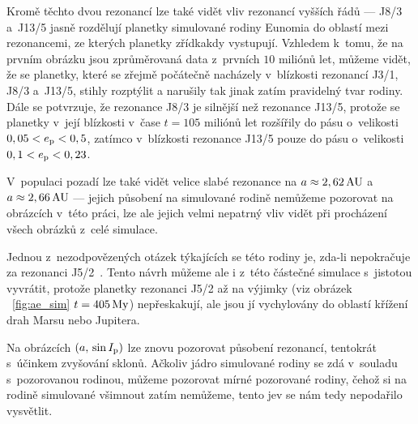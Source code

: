 \documentclass[A4paper, 12pt, oneside]{book}
\begin{document}
Kromě těchto dvou rezonancí lze také vidět vliv rezonancí vyšších řádů --- J8/3 a~J13/5 jasně rozdělují planetky simulované rodiny Eunomia do oblastí mezi rezonancemi, ze kterých planetky zřídkakdy vystupují. Vzhledem k~tomu, že na prvním obrázku jsou zprůměrovaná data z~prvních $10$ miliónů let, můžeme vidět, že se planetky, které se zřejmě počátečně nacházely v~blízkosti rezonancí J3/1, J8/3 a~J13/5, stihly rozptýlit a narušily tak jinak zatím pravidelný tvar rodiny. Dále se potvrzuje, že rezonance J8/3 je silnější než rezonance J13/5, protože se planetky v~její blízkosti v~čase $t=105$ miliónů let rozšířily do pásu o~velikosti $0,05<e_{\rm p}<0,5$, zatímco v~blízkosti rezonance J13/5 pouze do pásu o~velikosti $0,1<e_{\rm p}<0,23$.

V~populaci pozadí lze také vidět velice slabé rezonance na $a\approx2,62\,{\rm AU}$ a~$a\approx2,66\,{\rm AU}$ --- jejich působení na simulované rodině nemůžeme pozorovat na obrázcích v~této práci, lze ale jejich velmi nepatrný vliv vidět při procházení všech obrázků z~celé simulace.

Jednou z~nezodpovězených otázek týkajících se této rodiny je, zda-li nepokračuje za rezonanci J5/2~\cite{nesvorny15}. Tento návrh můžeme ale i z~této částečné simulace s~jistotou vyvrátit, protože planetky rezonanci J5/2 až na výjimky (viz obrázek ~\ref{fig:ae_sim} $t=405\,{\rm My}$) nepřeskakují, ale jsou jí vychylovány do oblastí křížení drah Marsu nebo Jupitera.

Na obrázcích $(a,\,\sin I_{\rm p})$ lze znovu pozorovat působení rezonancí, tentokrát s~účinkem zvyšování sklonů. Ačkoliv jádro simulované rodiny se zdá v~souladu s~pozorovanou rodinou, můžeme pozorovat mírné  pozorované rodiny, čehož si na rodině simulované všimnout zatím nemůžeme, tento jev se nám tedy nepodařilo vysvětlit.
\end{document}

